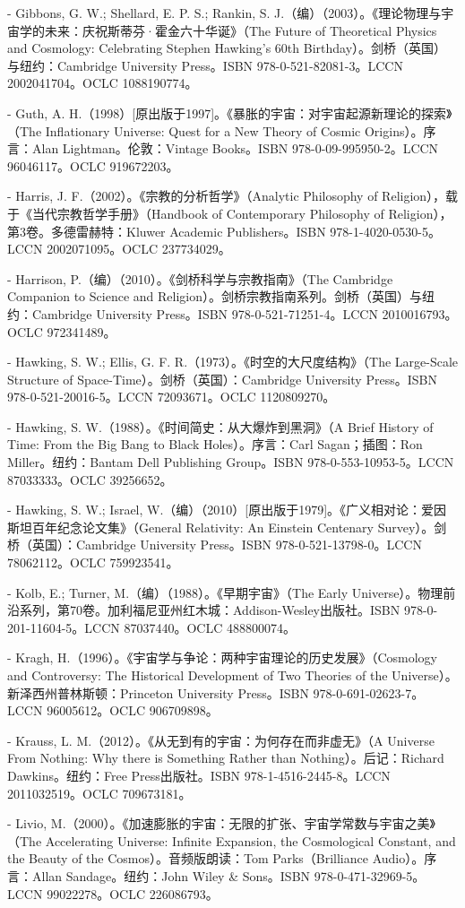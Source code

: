 \begin{itemize}
- Gibbons, G. W.; Shellard, E. P. S.; Rankin, S. J.（编）（2003）。《理论物理与宇宙学的未来：庆祝斯蒂芬·霍金六十华诞》（The Future of Theoretical Physics and Cosmology: Celebrating Stephen Hawking's 60th Birthday）。剑桥（英国）与纽约：Cambridge University Press。ISBN 978-0-521-82081-3。LCCN 2002041704。OCLC 1088190774。  

- Guth, A. H.（1998）[原出版于1997]。《暴胀的宇宙：对宇宙起源新理论的探索》（The Inflationary Universe: Quest for a New Theory of Cosmic Origins）。序言：Alan Lightman。伦敦：Vintage Books。ISBN 978-0-09-995950-2。LCCN 96046117。OCLC 919672203。  

- Harris, J. F.（2002）。《宗教的分析哲学》（Analytic Philosophy of Religion），载于《当代宗教哲学手册》（Handbook of Contemporary Philosophy of Religion），第3卷。多德雷赫特：Kluwer Academic Publishers。ISBN 978-1-4020-0530-5。LCCN 2002071095。OCLC 237734029。  

- Harrison, P.（编）（2010）。《剑桥科学与宗教指南》（The Cambridge Companion to Science and Religion）。剑桥宗教指南系列。剑桥（英国）与纽约：Cambridge University Press。ISBN 978-0-521-71251-4。LCCN 2010016793。OCLC 972341489。  

- Hawking, S. W.; Ellis, G. F. R.（1973）。《时空的大尺度结构》（The Large-Scale Structure of Space-Time）。剑桥（英国）：Cambridge University Press。ISBN 978-0-521-20016-5。LCCN 72093671。OCLC 1120809270。  

- Hawking, S. W.（1988）。《时间简史：从大爆炸到黑洞》（A Brief History of Time: From the Big Bang to Black Holes）。序言：Carl Sagan；插图：Ron Miller。纽约：Bantam Dell Publishing Group。ISBN 978-0-553-10953-5。LCCN 87033333。OCLC 39256652。  

- Hawking, S. W.; Israel, W.（编）（2010）[原出版于1979]。《广义相对论：爱因斯坦百年纪念论文集》（General Relativity: An Einstein Centenary Survey）。剑桥（英国）：Cambridge University Press。ISBN 978-0-521-13798-0。LCCN 78062112。OCLC 759923541。  

- Kolb, E.; Turner, M.（编）（1988）。《早期宇宙》（The Early Universe）。物理前沿系列，第70卷。加利福尼亚州红木城：Addison-Wesley出版社。ISBN 978-0-201-11604-5。LCCN 87037440。OCLC 488800074。  

- Kragh, H.（1996）。《宇宙学与争论：两种宇宙理论的历史发展》（Cosmology and Controversy: The Historical Development of Two Theories of the Universe）。新泽西州普林斯顿：Princeton University Press。ISBN 978-0-691-02623-7。LCCN 96005612。OCLC 906709898。  

- Krauss, L. M.（2012）。《从无到有的宇宙：为何存在而非虚无》（A Universe From Nothing: Why there is Something Rather than Nothing）。后记：Richard Dawkins。纽约：Free Press出版社。ISBN 978-1-4516-2445-8。LCCN 2011032519。OCLC 709673181。  

- Livio, M.（2000）。《加速膨胀的宇宙：无限的扩张、宇宙学常数与宇宙之美》（The Accelerating Universe: Infinite Expansion, the Cosmological Constant, and the Beauty of the Cosmos）。音频版朗读：Tom Parks（Brilliance Audio）。序言：Allan Sandage。纽约：John Wiley & Sons。ISBN 978-0-471-32969-5。LCCN 99022278。OCLC 226086793。  

\end{itemize}







